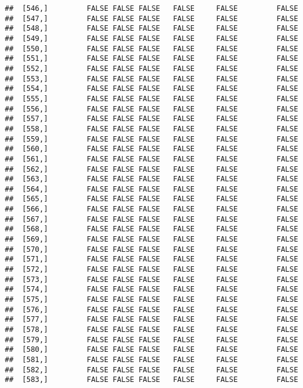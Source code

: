 \documentclass[
]{article}
\begin{document}
\begin{verbatim}
##  [546,]         FALSE FALSE FALSE   FALSE     FALSE         FALSE
##  [547,]         FALSE FALSE FALSE   FALSE     FALSE         FALSE
##  [548,]         FALSE FALSE FALSE   FALSE     FALSE         FALSE
##  [549,]         FALSE FALSE FALSE   FALSE     FALSE         FALSE
##  [550,]         FALSE FALSE FALSE   FALSE     FALSE         FALSE
##  [551,]         FALSE FALSE FALSE   FALSE     FALSE         FALSE
##  [552,]         FALSE FALSE FALSE   FALSE     FALSE         FALSE
##  [553,]         FALSE FALSE FALSE   FALSE     FALSE         FALSE
##  [554,]         FALSE FALSE FALSE   FALSE     FALSE         FALSE
##  [555,]         FALSE FALSE FALSE   FALSE     FALSE         FALSE
##  [556,]         FALSE FALSE FALSE   FALSE     FALSE         FALSE
##  [557,]         FALSE FALSE FALSE   FALSE     FALSE         FALSE
##  [558,]         FALSE FALSE FALSE   FALSE     FALSE         FALSE
##  [559,]         FALSE FALSE FALSE   FALSE     FALSE         FALSE
##  [560,]         FALSE FALSE FALSE   FALSE     FALSE         FALSE
##  [561,]         FALSE FALSE FALSE   FALSE     FALSE         FALSE
##  [562,]         FALSE FALSE FALSE   FALSE     FALSE         FALSE
##  [563,]         FALSE FALSE FALSE   FALSE     FALSE         FALSE
##  [564,]         FALSE FALSE FALSE   FALSE     FALSE         FALSE
##  [565,]         FALSE FALSE FALSE   FALSE     FALSE         FALSE
##  [566,]         FALSE FALSE FALSE   FALSE     FALSE         FALSE
##  [567,]         FALSE FALSE FALSE   FALSE     FALSE         FALSE
##  [568,]         FALSE FALSE FALSE   FALSE     FALSE         FALSE
##  [569,]         FALSE FALSE FALSE   FALSE     FALSE         FALSE
##  [570,]         FALSE FALSE FALSE   FALSE     FALSE         FALSE
##  [571,]         FALSE FALSE FALSE   FALSE     FALSE         FALSE
##  [572,]         FALSE FALSE FALSE   FALSE     FALSE         FALSE
##  [573,]         FALSE FALSE FALSE   FALSE     FALSE         FALSE
##  [574,]         FALSE FALSE FALSE   FALSE     FALSE         FALSE
##  [575,]         FALSE FALSE FALSE   FALSE     FALSE         FALSE
##  [576,]         FALSE FALSE FALSE   FALSE     FALSE         FALSE
##  [577,]         FALSE FALSE FALSE   FALSE     FALSE         FALSE
##  [578,]         FALSE FALSE FALSE   FALSE     FALSE         FALSE
##  [579,]         FALSE FALSE FALSE   FALSE     FALSE         FALSE
##  [580,]         FALSE FALSE FALSE   FALSE     FALSE         FALSE
##  [581,]         FALSE FALSE FALSE   FALSE     FALSE         FALSE
##  [582,]         FALSE FALSE FALSE   FALSE     FALSE         FALSE
##  [583,]         FALSE FALSE FALSE   FALSE     FALSE         FALSE

\end{verbatim}
\end{document}
